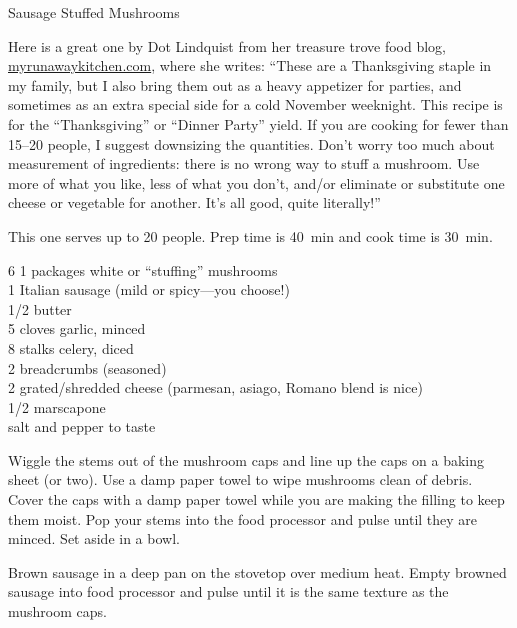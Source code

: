 \begin{entry}{Sausage Stuffed Mushrooms}

\begin{open}
  Here is a great one by Dot Lindquist from her treasure trove food blog,
  \url{myrunawaykitchen.com}, where she writes: ``These are a Thanksgiving
  staple in my family, but I also bring them out as a heavy appetizer for
  parties, and sometimes as an extra special side for a cold November
  weeknight.  This recipe is for the ``Thanksgiving'' or ``Dinner Party''
  yield.  If you are cooking for fewer than \numrange{15}{20} people, I
  suggest downsizing the quantities.  Don’t worry too much about measurement
  of ingredients: there is no wrong way to stuff a mushroom.  Use more of what
  you like, less of what you don't, and/or eliminate or substitute one cheese
  or vegetable for another.  It's all good, quite literally!''

  This one serves up to 20 people.  Prep time is \SI{40}{\minute} and cook
  time is \SI{30}{\minute}.
\end{open}
\begin{ingredients}
    6 \SI{1}{\quart} packages white or ``stuffing'' mushrooms\\
    \SI{1}{\pound} Italian sausage (mild or spicy---you choose!)\\
    \SI{1/2}{\cup} butter\\
    5 cloves garlic, minced\\
    8 stalks celery, diced\\
    \SI{2}{\cup} breadcrumbs (seasoned)\\
    \SI{2}{\cup} grated/shredded cheese (parmesan, asiago, Romano blend is
    nice)\\
    \SI{1/2}{\cup} marscapone\\
    salt and pepper to taste
\end{ingredients}
Wiggle the stems out of the mushroom caps and line up the caps on a baking sheet
(or two). Use a damp paper towel to wipe mushrooms clean of debris. Cover the
caps with a damp paper towel while you are making the filling to keep them
moist. Pop your stems into the food processor and pulse until they are minced.
Set aside in a bowl.

Brown sausage in a deep pan on the stovetop over medium heat. Empty browned
sausage into food processor and pulse until it is the same texture as the
mushroom caps.


\end{entry}
